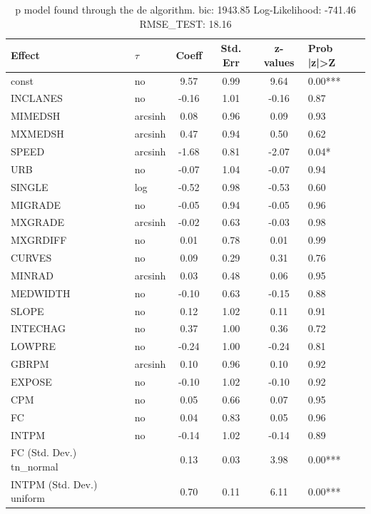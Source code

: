 \begin{table}
	\caption{p model found through the de algorithm. bic: 1943.85 Log-Likelihood: -741.46 RMSE_TEST: 18.16}
	\begin{center}
		\begin{tabular}{|l|l|c|c|c|l|}
			\hline
			Effect & $\tau$ & Coeff & Std. Err & z-values & Prob |z|>Z \\
			\hline
			const & no & 9.57 & 0.99 & 9.64 & 0.00*** \\
			\hline
			INCLANES & no & -0.16 & 1.01 & -0.16 & 0.87 \\
			\hline
			MIMEDSH & arcsinh & 0.08 & 0.96 & 0.09 & 0.93 \\
			\hline
			MXMEDSH & arcsinh & 0.47 & 0.94 & 0.50 & 0.62 \\
			\hline
			SPEED & arcsinh & -1.68 & 0.81 & -2.07 & 0.04* \\
			\hline
			URB & no & -0.07 & 1.04 & -0.07 & 0.94 \\
			\hline
			SINGLE & log & -0.52 & 0.98 & -0.53 & 0.60 \\
			\hline
			MIGRADE & no & -0.05 & 0.94 & -0.05 & 0.96 \\
			\hline
			MXGRADE & arcsinh & -0.02 & 0.63 & -0.03 & 0.98 \\
			\hline
			MXGRDIFF & no & 0.01 & 0.78 & 0.01 & 0.99 \\
			\hline
			CURVES & no & 0.09 & 0.29 & 0.31 & 0.76 \\
			\hline
			MINRAD & arcsinh & 0.03 & 0.48 & 0.06 & 0.95 \\
			\hline
			MEDWIDTH & no & -0.10 & 0.63 & -0.15 & 0.88 \\
			\hline
			SLOPE & no & 0.12 & 1.02 & 0.11 & 0.91 \\
			\hline
			INTECHAG & no & 0.37 & 1.00 & 0.36 & 0.72 \\
			\hline
			LOWPRE & no & -0.24 & 1.00 & -0.24 & 0.81 \\
			\hline
			GBRPM & arcsinh & 0.10 & 0.96 & 0.10 & 0.92 \\
			\hline
			EXPOSE & no & -0.10 & 1.02 & -0.10 & 0.92 \\
			\hline
			CPM & no & 0.05 & 0.66 & 0.07 & 0.95 \\
			\hline
			FC & no & 0.04 & 0.83 & 0.05 & 0.96 \\
			\hline
			INTPM & no & -0.14 & 1.02 & -0.14 & 0.89 \\
			\hline
			FC (Std. Dev.) tn_normal &  & 0.13 & 0.03 & 3.98 & 0.00*** \\
			\hline
			INTPM (Std. Dev.) uniform &  & 0.70 & 0.11 & 6.11 & 0.00*** \\
			\hline
		\end{tabular}
	\end{center}
\end{table}
